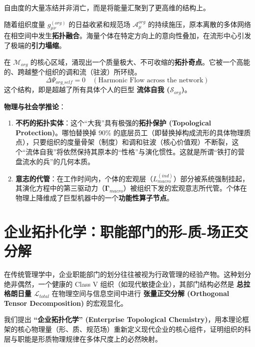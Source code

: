 
自由度的大量冻结并非消亡，而是将能量汇聚到了更高维的结构上。

随着组织度量 $g_{\mu\nu}^{(org)}$ 的日益收紧和规范场 $\mathcal{A}_\mu^{org}$ 的持续施压，原本离散的多体网络在相空间中发生\textbf{拓扑融合}。海量个体在特定方向上的意向性叠加，在流形中心引发了极端的\textbf{引力塌缩}。

\begin{definition}[组织自我的拓扑奇点]
    在 $\mathcal{M}_{org}$ 的核心区域，涌现出一个质量极大、不可收缩的\textbf{拓扑奇点}。它被一个高能的、跨越整个组织的调和流（驻波）所环绕。
    $$ \Delta \Psi_{org\_self} = 0 \quad (\text{Harmonic Flow across the network}) $$
    这个结构，即是超越了所有具体个人的巨型 \textbf{流体自我 ($\mathcal{S}_{org}$)}。
\end{definition}

\textbf{物理与社会学推论}：
\begin{enumerate}
    \item \textbf{不朽的拓扑实体}：这个“大我”具有极强的\textbf{拓扑保护 (Topological Protection)}。哪怕替换掉 90\% 的底层员工（即替换掉构成流形的具体物理质点），只要组织的度量骨架（制度）和调和驻波（核心价值观）不断裂，这个“流体自我”将依然保持其原本的“性格”与演化惯性。这就是所谓“铁打的营盘流水的兵”的几何本质。
    \item \textbf{意志的代管}：在工作时间内，个体的宏观层（$L_{macro}^{(ind)}$）部分被系统强制挂起，其演化方程中的第三驱动力（$\mathbf{\Gamma}_{macro}$）被组织下发的宏观意志所代管。个体在物理上降维成了巨型机器中的一个\textbf{功能性算子节点}。
\end{enumerate}

\section{企业拓扑化学：职能部门的形-质-场正交分解}
\label{sec:enterprise_topological_chemistry}

在传统管理学中，企业职能部门的划分往往被视为行政管理的经验产物。这种划分绝非偶然，一个健康的 Class V 组织（如现代敏捷企业），其部门结构必然是 \textbf{总拉格朗日量 $\mathcal{L}_{total}$} 在物理空间与信息空间中进行 \textbf{张量正交分解 (Orthogonal Tensor Decomposition)} 的宏观显化。

我们提出 \textbf{“企业拓扑化学” (Enterprise Topological Chemistry)}，用本理论框架的核心物理量（形、质、规范场）重新定义现代企业的核心组件，证明组织的科层与职能是形质物理规律在多体尺度上的必然映射。

